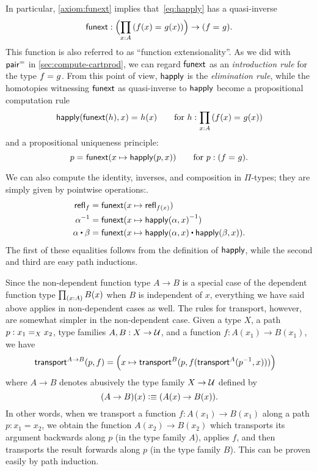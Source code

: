 In particular, \autoref{axiom:funext} implies that~\eqref{eq:happly} has a quasi-inverse
\[
\funext : \Parens{\prd{x:A} (\id{f(x)}{g(x)})} \to {(\id{f}{g})}.
\]
This function is also referred to as ``function extensionality''.
As we did with $\pairpath$ in \autoref{sec:compute-cartprod}, we can regard $\funext$ as an \emph{introduction rule} for the type $\id f g$.
From this point of view, $\happly$ is the \emph{elimination rule}, while the homotopies witnessing $\funext$ as quasi-inverse to $\happly$ become a propositional computation rule
\[
\id{\happly({\funext{(h)}},x)}{h(x)} \qquad\text{for }h:\prd{x:A} (\id{f(x)}{g(x)})
\]
and a propositional uniqueness principle:
\[
\id{p}{\funext (x \mapsto \happly(p,{x}))} \qquad\text{for } p: (\id f g).
\]

We can also compute the identity, inverses, and composition in $\Pi$-types; they are simply given by pointwise operations:.
\begin{align*}
\refl{f} &= \funext(x \mapsto \refl{f(x)}) \\
\opp{\alpha} &= \funext (x \mapsto \opp{\happly (\alpha,x)})  \\
{\alpha} \ct \beta &= \funext (x \mapsto {\happly({\alpha},x) \ct \happly({\beta},x)}).
\end{align*}
The first of these equalities follows from the definition of $\happly$, while the second and third are easy path inductions.

Since the non-dependent function type $A\to B$ is a special case of the dependent function type $\prd{x:A} B(x)$ when $B$ is independent of $x$, everything we have said above applies in non-dependent cases as well.
%
The rules for transport, however, are somewhat simpler in the non-dependent case.
Given a type $X$, a path $p:\id[X]{x_1}{x_2}$, type families $A,B:X\to \type$, and a function $f : A(x_1) \to B(x_1)$,  we have
\begin{align}\label{eq:transport-arrow}
  \transfib{A\to B}{p}{f} &=
  \Big(x \mapsto \transfib{B}{p}{f(\transfib{A}{\opp p}{x})}\Big)
\end{align}
where $A\to B$ denotes abusively the type family $X\to \type$ defined by
\[(A\to B)(x) \defeq (A(x)\to B(x)).\]
In other words, when we transport a function $f:A(x_1)\to B(x_1)$ along a path $p:x_1=x_2$, we obtain the function $A(x_2)\to B(x_2)$ which transports its argument backwards along $p$ (in the type family $A$), applies $f$, and then transports the result forwards along $p$ (in the type family $B$).
This can be proven easily by path induction.

